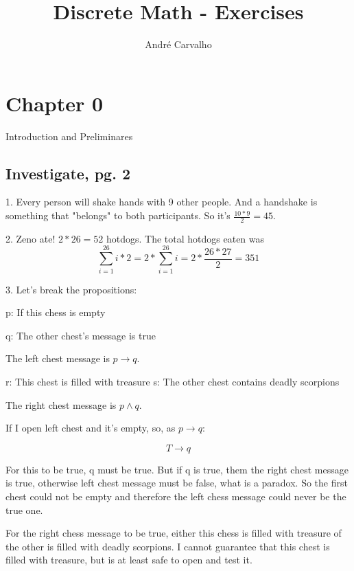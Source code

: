 \documentclass{article}
\begin{document}
  \fontsize{14}{15}\selectfont %
	\title{Discrete Math - Exercises}
	\author{André Carvalho}
	
	\maketitle
	
	\setcounter{section}{-1} %
	
	\section{Chapter 0}
	Introduction and Preliminares
	
	\subsection{Investigate, pg. 2}
	1. Every person will shake hands with 9 other people. And a handshake is something that "belongs" to both participants. So it's $\frac{10 * 9}{2} = 45$.
	  
	2. Zeno ate! $2 * 26 = 52$ hotdogs. The total hotdogs eaten was 
	$$
	\sum_{i=1}^{26} i*2 = 2 * \sum_{i=1}^{26} i = 2 * \frac{26 * 27}{2} = 351
	$$

	3. Let's break the propositions:

	p: If this chess is empty

	q: The other chest's message is true

	The left chest message is $p \rightarrow q$.

	r: This chest is filled with treasure
	s: The other chest contains deadly scorpions

	The right chest message is $p \wedge q$.

	If I open left chest and it's empty, so, as $p \rightarrow q$:

	$$T \rightarrow q$$

	For this to be true, q must be true. But if q is true, them the right chest message is true, otherwise left chest message must be false, what is a paradox. So the first chest could not be empty and therefore the left chess message could never be the true one.

	For the right chess message to be true, either this chess is filled with treasure of the other is filled with deadly scorpions. I cannot guarantee that this chest is filled with treasure, but is at least safe to open and test it.
	
\end{document}
